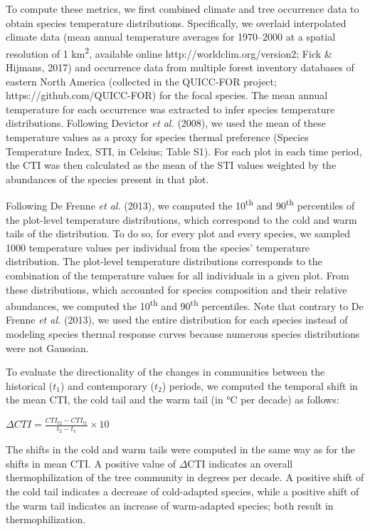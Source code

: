 \documentclass[a4paperpaper,]{article}
\begin{document}
To compute these metrics, we first combined climate and tree occurrence
data to obtain species temperature distributions. Specifically, we
overlaid interpolated climate data (mean annual temperature averages for
1970--2000 at a spatial resolution of 1 km\textsuperscript{2}, available
online http://worldclim.org/version2; Fick \& Hijmans, 2017) and
occurrence data from multiple forest inventory databases of eastern
North America (collected in the QUICC-FOR project;
https://github.com/QUICC-FOR) for the focal species. The mean annual
temperature for each occurrence was extracted to infer species
temperature distributions. Following Devictor \emph{et al.} (2008), we
used the mean of these temperature values as a proxy for species thermal
preference (Species Temperature Index, STI, in Celsius; Table S1). For
each plot in each time period, the CTI was then calculated as the mean
of the STI values weighted by the abundances of the species present in
that plot.

Following De Frenne \emph{et al.} (2013), we computed the
10\textsuperscript{th} and 90\textsuperscript{th} percentiles of the
plot-level temperature distributions, which correspond to the cold and
warm tails of the distribution. To do so, for every plot and every
species, we sampled 1000 temperature values per individual from the
species' temperature distribution. The plot-level temperature
distributions corresponds to the combination of the temperature values
for all individuals in a given plot. From these distributions, which
accounted for species composition and their relative abundances, we
computed the 10\textsuperscript{th} and 90\textsuperscript{th}
percentiles. Note that contrary to De Frenne \emph{et al.} (2013), we
used the entire distribution for each species instead of modeling
species thermal response curves because numerous species distributions
were not Gaussian.

To evaluate the directionality of the changes in communities between the
historical (\(t_1\)) and contemporary (\(t_2\)) periods, we computed the
temporal shift in the mean CTI, the cold tail and the warm tail (in °C
per decade) as follows:

\(\Delta CTI = \frac{CTI_{t2} - CTI_{t1}}{t_2 - t_1} \times 10\)

The shifts in the cold and warm tails were computed in the same way as
for the shifts in mean CTI. A positive value of \(\Delta\)CTI indicates
an overall thermophilization of the tree community in degrees per
decade. A positive shift of the cold tail indicates a decrease of
cold-adapted species, while a positive shift of the warm tail indicates
an increase of warm-adapted species; both result in thermophilization.
\end{document}
